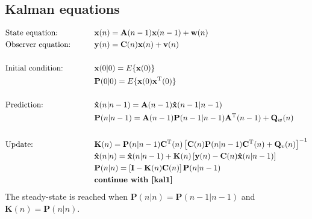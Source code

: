 \subsection{Kalman equations}
\begin{alignat}{2}
	&\text{State equation:}\qquad&&\mathbf{x}(n) =\mathbf{A}(n-1)\mathbf{x}(n-1) + \mathbf{w}(n)\nonumber\\
	&\text{Observer equation:}\qquad&&\mathbf{y}(n) =\mathbf{C}(n)\mathbf{x}(n) + \mathbf{v}(n)\nonumber\\
	\nonumber\\
	&\text{Initial condition:}	\qquad	&&\mathbf{x}(0|0)=E\{\mathbf{x}(0)\}\nonumber\\
										&&&\mathbf{P}(0|0)=E\{\mathbf{x}(0)\mathbf{x}^{\mathrm T}(0)\}\nonumber\\
	\nonumber\\
	\label{kal1}
	&\text{Prediction:}			\qquad	&&\mathbf{\hat{x}}(n|n-1)=\mathbf{A}(n-1)\mathbf{\hat{x}}(n-1|n-1)\\
										&&&\mathbf{P}(n|n-1)=\mathbf{A}(n-1)\mathbf{P}(n-1|n-1)\mathbf{A}^{\mathrm T}(n-1) + \mathbf{Q}_w(n)\\
	\nonumber\\
	&\text{Update:}				\qquad	&&\mathbf{K}(n)=\mathbf{P}(n|n-1)\mathbf{C}^{\mathrm T}(n)\left[\mathbf{C}(n) \mathbf{P}(n|n-1)\mathbf{C}^{\mathrm T}(n)+\mathbf{Q}_v(n)\right]^{-1}\\
										&&&\mathbf{\hat{x}}(n|n)=\mathbf{\hat{x}}(n|n-1)+\mathbf{K}(n)\left[\mathbf{y}(n)-\mathbf{C}(n)\mathbf{\hat{x}}(n|n-1)\right]\\
										&&&\mathbf{P}(n|n)=\left[\mathbf{I}-\mathbf{K}(n)\mathbf{C}(n)\right]\mathbf{P}(n|n-1)\\
										&&&\textbf{continue with \eqref{kal1}}	
\end{alignat}
The steady-state is reached when $\mathbf{P}(n|n) = \mathbf{P}(n-1 | n-1)$ and $\mathbf{K}(n) = \mathbf{P}(n|n)$.

